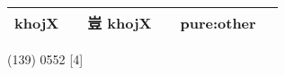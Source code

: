 \documentclass[14pt,a4paper]{scrartcl}
\begin{document}
\begin{longtable}[c]{@{}llllll@{}}
\begin{minipage}[t]{0.14\columnwidth}
khojX
\strut\end{minipage} &
\begin{minipage}[t]{0.14\columnwidth}\raggedright\strut
\strut\end{minipage} &
\begin{minipage}[t]{0.14\columnwidth}\raggedright\strut
豈 khojX
\strut\end{minipage} &
\begin{minipage}[t]{0.14\columnwidth}\raggedright\strut
\strut\end{minipage} &
\begin{minipage}[t]{0.14\columnwidth}\raggedright\strut
pure:other
\strut\end{minipage}\tabularnewline
\bottomrule
\end{longtable}

(139) 0552 {[}4{]}
\end{document}
